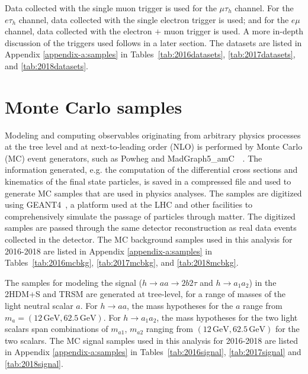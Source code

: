 Data collected with the single muon trigger is used for the $\mu\tau_{h}$ channel. For the $e\tau_{h}$ channel, data collected with the single electron trigger is used; and for the $e\mu$ channel, data collected with the electron $+$ muon trigger is used. A more in-depth discussion of the triggers used follows in a later section. The datasets are listed in Appendix \ref{appendix-a:samples} in Tables~\ref{tab:2016datasets}, \ref{tab:2017datasets}, and \ref{tab:2018datasets}.

\section{Monte Carlo samples}
\label{section:mc-samples}
Modeling and computing observables originating from arbitrary physics processes at the tree level and at next-to-leading order (NLO) is performed by Monte Carlo (MC) event generators, such as Powheg and MadGraph5\_amC\@NLO~\cite{Alwall_2014}~\cite{Frederix_2018}. The information generated, e.g. the computation of the differential cross sections and kinematics of the final state particles, is saved in a compressed file and used to generate MC samples that are used in physics analyses. The samples are digitized using GEANT4~\cite{agostinelli_geant4simulation_2003}, a platform used at the LHC and other facilities to comprehensively simulate the passage of particles through matter. The digitized samples are passed through the same detector reconstruction as real data events collected in the detector. The MC background samples used in this analysis for 2016-2018 are listed in Appendix \ref{appendix-a:samples} in Tables~\ref{tab:2016mcbkg}, \ref{tab:2017mcbkg}, and \ref{tab:2018mcbkg}.

The samples for modeling the signal ($h \rightarrow aa \rightarrow 2b2\tau$ and $h\rightarrow a_1 a_2$) in the 2HDM+S and TRSM are generated at tree-level, for a range of masses of the light neutral scalar $a$. For $h \rightarrow aa$, the mass hypotheses for the $a$ range from $m_a = (12 \,\text{GeV}, 62.5 \,\text{GeV})$. For $h \rightarrow a_1 a_2$, the mass hypotheses for the two light scalars span combinations of $m_{a1}$, $m_{a2}$ ranging from $(12 \,\text{GeV}, 62.5 \,\text{GeV})$ for the two scalars. The MC signal samples used in this analysis for 2016-2018 are listed in Appendix \ref{appendix-a:samples} in Tables~\ref{tab:2016signal}, \ref{tab:2017signal} and \ref{tab:2018signal}. 



